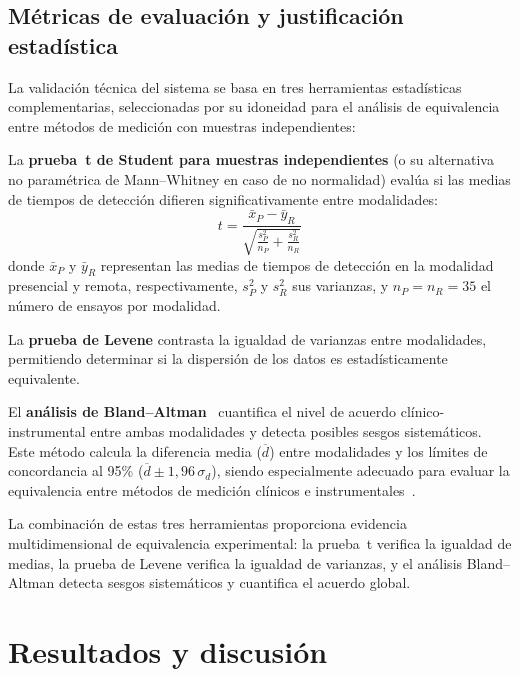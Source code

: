 \documentclass{espol-rte}
\begin{document}
\subsection{M\'etricas de evaluaci\'on y justificaci\'on estad\'istica}

La validaci\'on t\'ecnica del sistema se basa en tres herramientas estad\'isticas complementarias, seleccionadas por su idoneidad para el an\'alisis de equivalencia entre m\'etodos de medici\'on con muestras independientes:

La \textbf{prueba~t de Student para muestras independientes} (o su alternativa no param\'etrica de Mann--Whitney en caso de no normalidad) eval\'ua si las medias de tiempos de detecci\'on difieren significativamente entre modalidades:
\begin{equation}
  t = \frac{\bar{x}_P - \bar{y}_R}{\sqrt{\frac{s_P^2}{n_P} + \frac{s_R^2}{n_R}}}
  \label{eq:ttest}
\end{equation}
donde $\bar{x}_P$ y $\bar{y}_R$ representan las medias de tiempos de detecci\'on en la modalidad presencial y remota, respectivamente, $s_P^2$ y $s_R^2$ sus varianzas, y $n_P = n_R = 35$ el n\'umero de ensayos por modalidad.

La \textbf{prueba de Levene} contrasta la igualdad de varianzas entre modalidades, permitiendo determinar si la dispersi\'on de los datos es estad\'isticamente equivalente.

El \textbf{an\'alisis de Bland--Altman}~\parencite{bland1986} cuantifica el nivel de acuerdo cl\'inico-instrumental entre ambas modalidades y detecta posibles sesgos sistem\'aticos. Este m\'etodo calcula la diferencia media ($\overline{d}$) entre modalidades y los l\'imites de concordancia al 95\% ($\overline{d} \pm 1{,}96\,\sigma_d$), siendo especialmente adecuado para evaluar la equivalencia entre m\'etodos de medici\'on cl\'inicos e instrumentales~\parencite{giavarina2015}.

La combinaci\'on de estas tres herramientas proporciona evidencia multidimensional de equivalencia experimental: la prueba~t verifica la igualdad de medias, la prueba de Levene verifica la igualdad de varianzas, y el an\'alisis Bland--Altman detecta sesgos sistem\'aticos y cuantifica el acuerdo global.

\section{Resultados y discusi\'on}
\end{document}
